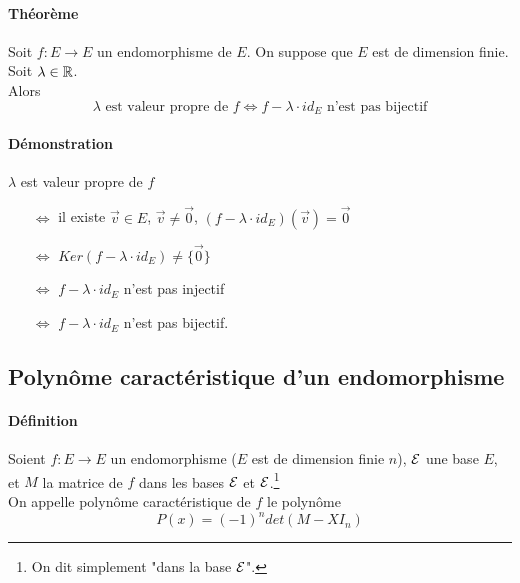 \begin{enumerate}
\end{enumerate}

\paragraph{Théorème} Soit $f: E \rightarrow E$ un endomorphisme de $E$. On suppose que $E$ est de dimension finie. Soit $\lambda \in \mathbb{R}$. \\
Alors 
$$\lambda \text{ est valeur propre de } f \Leftrightarrow f- \lambda \cdot id_E \text{ n'est pas bijectif}$$
      
\paragraph{Démonstration} $\lambda$ est valeur propre de $f$
\begin{itemize}
  \item[$\Leftrightarrow$] il existe $\vec{v} \in E$, $\vec{v} \neq \vec{0}$, $(f - \lambda \cdot id_E)(\vec{v}) = \vec{0}$ 
  \item[$\Leftrightarrow$] $Ker(f-\lambda\cdot id_E) \neq \{\vec{0}\}$
  \item[$\Leftrightarrow$] $f-\lambda \cdot id_E$ n'est pas injectif 
  \item[$\Leftrightarrow$] $f-\lambda \cdot id_E$ n'est pas bijectif.
\end{itemize}

%
\subsection{Polynôme caractéristique d'un endomorphisme}
%
\paragraph{Définition} Soient $f: E \rightarrow E$ un endomorphisme ($E$ est de dimension finie $n$), $\mathcal{E}$ une base $E$, et $M$ la matrice de $f$ dans les bases $\mathcal{E}$ et $\mathcal{E}$.\footnote{On dit simplement "dans la base $\mathcal{E}$".} \\
On appelle polynôme caractéristique de $f$ le polynôme
$$P(x) = (-1)^{n} det(M - X I_n)$$

